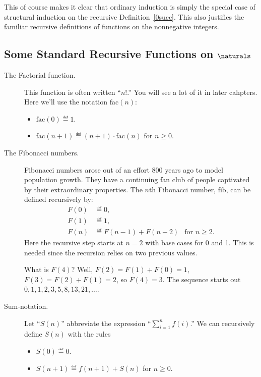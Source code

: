 This of course makes it clear that ordinary induction is simply the
special case of structural induction on the recursive
Definition~\ref{0succ}.  This also justifies the familiar recursive
definitions of functions on the nonnegative integers.

\subsection{Some Standard Recursive Functions on  $\naturals$}

\begin{description}
\item[The Factorial function.] This function is often written ``$n!$.''
  You will see a lot of it in later cahpters.  Here we'll use the notation
  $\text{fac}(n)$:
\begin{itemize}
\item $\text{fac}(0) \eqdef 1$.
\item $\text{fac}(n+1) \eqdef (n+1)\cdot \text{fac}(n)$ for $n \ge 0$.
\end{itemize}

\item[The Fibonacci numbers.]  Fibonacci numbers arose out of an effort 800
  years ago to model population growth.  They have a continuing fan club of
  people captivated by their extraordinary properties.  The $n$th Fibonacci
  number, $\text{fib}$, can be defined recursively by:
\begin{align*}
F(0) &\eqdef 0,\\
F(1) &\eqdef 1,\\ 
F(n) &\eqdef F(n-1) + F(n-2) &\mbox{for $n \geq 2$.} 
\end{align*}
Here the recursive step starts at $n=2$ with base cases for 0 and 1.  This
is needed since the recursion relies on two previous values.

What is $F(4)$?  Well, $F(2) = F(1)+F(0) = 1$, $F(3) =
F(2)+F(1) = 2$, so $F(4) = 3$.  The sequence
starts out $0, 1, 1, 2, 3, 5, 8, 13, 21,\dots$.


\item[Sum-notation.]  Let ``$S(n)$'' abbreviate the expression
``$\sum_{i=1}^n f(i)$.''  We can recursively define $S(n)$ with the rules
  \begin{itemize}
  \item $S(0) \eqdef 0$.
  \item $S(n+1) \eqdef  f(n+1) + S(n)$ for $n\geq 0$.
  \end{itemize}


\end{description}
